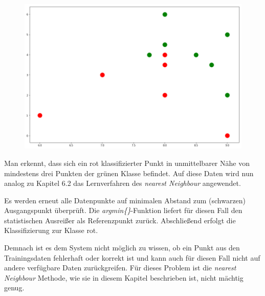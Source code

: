 \documentclass[fontsize=11pt]{scrartcl}
\begin{document}
                \begin{figure}
                    \includegraphics[scale=0.3]{errnn3.png}
                \end{figure}
                
                  Man erkennt, dass sich ein rot klassifizierter Punkt in unmittelbarer Nähe von mindestens drei Punkten der grünen Klasse befindet. %
               	Auf diese Daten wird nun analog zu Kapitel 6.2 das Lernverfahren des \emph{nearest Neighbour} angewendet.\par
                
                Es werden erneut alle Datenpunkte auf minimalen Abstand zum (schwarzen) Ausgangspunkt überprüft. Die \emph{argmin\{\}}-Funktion liefert für diesen Fall den statistischen Ausreißer als Referenzpunkt zurück. Abschließend erfolgt die Klassifizierung zur Klasse rot.\par Demnach ist es dem System nicht möglich zu wissen, ob ein Punkt aus den Trainingsdaten fehlerhaft oder korrekt ist und kann auch für diesen Fall nicht auf andere verfügbare Daten zurückgreifen. Für dieses Problem ist die \emph{nearest Neighbour} Methode, wie sie in diesem Kapitel beschrieben ist, nicht mächtig genug.
                         
\end{document}
